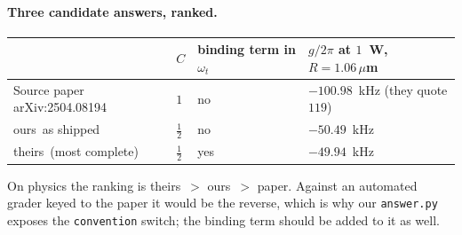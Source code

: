 \documentclass[11pt,a4paper]{article}
\newcommand{\ours}{\textsf{ours}}
\newcommand{\theirs}{\textsf{theirs}}
\begin{document}
\paragraph{Three candidate answers, ranked.}
\begin{center}\small
\begin{tabular}{llll}
\toprule
& $C$ & binding term in $\omega_t$ & $g/2\pi$ at $1$~W, $R=1.06\,\mu$m \\
\midrule
Source paper arXiv:2504.08194 & $1$ & no & $-100.98$~kHz (they quote $119$) \\
\ours\ as shipped & $\tfrac12$ & no & $-50.49$~kHz \\
\theirs\ (most complete) & $\tfrac12$ & yes & $-49.94$~kHz \\
\bottomrule
\end{tabular}
\end{center}

\noindent
On physics the ranking is \theirs\ $>$ \ours\ $>$ paper.  Against an automated
grader keyed to the paper it would be the reverse, which is why our
\texttt{answer.py} exposes the \texttt{convention} switch; the binding term
should be added to it as well.
\end{document}
